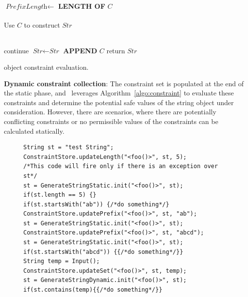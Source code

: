 \begin{mylist}
\begin{algorithm}[t]
{{        $\textit{PrefixLength} \longleftarrow$ {\bf LENGTH OF} $C$\\
        
         {\\
          \mytab  Use $C$ to construct $\textit{Str}$
        }
    }

     {
         {\\
          \mytab  continue
        }
        $\textit{Str} \leftarrow \textit{Str}$ {\bf APPEND} $C$
    }
    return $\textit{Str}$
}
\caption{ object constraint evaluation.}
\label{algo:constraint}
\end{algorithm}

 \item \textbf{Dynamic constraint collection}: The constraint set is populated
at the end of the static phase, and \tool\ leverages
Algorithm~\ref{algo:constraint} to evaluate these constraints and determine the
potential safe values of the string object under consideration. However, there
are scenarios, where there are potentially conflicting constraints or no
permissible values of the constraints can be calculated statically.


\begin{figure}[!htb]
\begin{lstlisting}
String st = "test String";
ConstraintStore.updateLength("<foo()>", st, 5);
/*This code will fire only if there is an exception over st*/
st = GenerateStringStatic.init("<foo()>", st);
if(st.length == 5) {}
if(st.startsWith("ab")) {/*do something*/}
ConstraintStore.updatePrefix("<foo()>", st, "ab");
st = GenerateStringStatic.init("<foo()>", st);
ConstraintStore.updatePrefix("<foo()>", st, "abcd");
st = GenerateStringStatic.init("<foo()>", st);
if(st.startsWith("abcd")) {{/*do something*/}}
String temp = Input();
ConstraintStore.updateSet("<foo()>", st, temp);
st = GenerateStringDynamic.init("<foo()>", st);
if(st.contains(temp){{/*do something*/}}
\end{lstlisting}
\end{figure}


\end{mylist}
